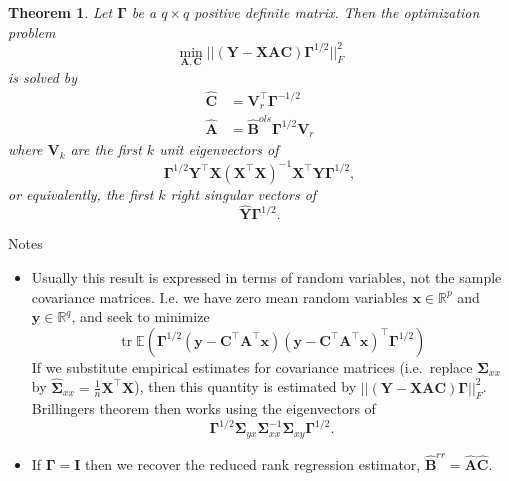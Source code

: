 \documentclass[
]{book}
\newtheorem{theorem}{Theorem}[chapter]
\theoremstyle{definition}
\theoremstyle{definition}
\theoremstyle{definition}
\theoremstyle{definition}
\theoremstyle{remark}
\begin{document}
\begin{theorem}
\protect\hypertarget{thm:unnamed-chunk-13}{}{\label{thm:unnamed-chunk-13} }Let \(\boldsymbol \Gamma\) be a \(q \times q\) positive definite matrix. Then
the optimization problem
\[ \min_{\mathbf A,\mathbf C} ||(\mathbf Y-\mathbf X\mathbf A\mathbf C)\boldsymbol \Gamma^{1/2}||_F^2\]
is solved by
\begin{align*}
\hat{\mathbf C} &= \mathbf V_r^\top \boldsymbol \Gamma^{-1/2}\\
\hat{\mathbf A}&=\hat{\mathbf B}^{ols} \boldsymbol \Gamma^{1/2}\mathbf V_r
\end{align*}
where \(\mathbf V_k\) are the first \(k\) unit eigenvectors of \[\boldsymbol \Gamma^{1/2}\mathbf Y^\top\mathbf X(\mathbf X^\top \mathbf X)^{-1}\mathbf X^\top \mathbf Y\boldsymbol \Gamma^{1/2},\] or equivalently, the first \(k\) right singular vectors of
\[\hat{\mathbf Y}\boldsymbol \Gamma^{1/2}.\]
\end{theorem}

Notes

\begin{itemize}
\item
  Usually this result is expressed in terms of random variables, not the sample covariance matrices. I.e. we have zero mean random variables \(\mathbf x\in \mathbb{R}^p\) and \(\mathbf y\in \mathbb{R}^q\), and seek to minimize
  \[\operatorname{tr}{\mathbb{E}}\left( \boldsymbol \Gamma^{1/2}(\mathbf y-\mathbf C^\top \mathbf A^\top \mathbf x)(\mathbf y-\mathbf C^\top \mathbf A^\top \mathbf x)^\top \boldsymbol \Gamma^{1/2}\right)\]
  If we substitute empirical estimates for covariance matrices (i.e.~replace \(\boldsymbol{\Sigma}_{xx}\) by \(\hat{\boldsymbol{\Sigma}}_{xx}=\frac{1}{n}\mathbf X^\top\mathbf X\)), then this quantity is estimated by \(||(\mathbf Y- \mathbf X\mathbf A\mathbf C)\boldsymbol \Gamma||_F^2\). Brillingers theorem then works using the eigenvectors of \[\boldsymbol \Gamma^{1/2}\boldsymbol{\Sigma}_{yx}\boldsymbol{\Sigma}_{xx}^{-1}\boldsymbol{\Sigma}_{xy}\boldsymbol \Gamma^{1/2}.\]
\item
  If \(\boldsymbol \Gamma=\mathbf I\) then we recover the reduced rank regression estimator, \(\hat{\mathbf B}^{rr}=\hat{\mathbf A}\hat{\mathbf C}\).
\end{itemize}
\end{document}
